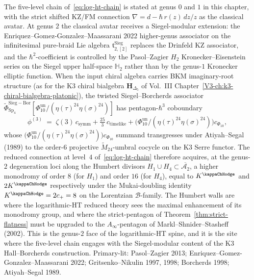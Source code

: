 \begin{remark}
\label{rem:genus2-siegel-borcherds-log-ht-extension}
The five-level chain of~\eqref{eq:log-ht-chain} is stated at genus $0$
and $1$ in this chapter, with the strict shifted KZ/FM connection
$\nabla = d - \hbar\,r(z)\,dz/z$ as the classical avatar. At genus $2$
the classical avatar receives a Siegel-modular extension: the
Enriquez--Gomez-Gonzalez--Maassarani 2022 higher-genus associator on
the infinitesimal pure-braid Lie algebra
$\mathfrak{t}^{\mathrm{Sieg}}_{2,[2]}$ replaces the Drinfeld KZ
associator, and the $\hbar^2$-coefficient is controlled by the
Pasol--Zagier $H_2$ Kronecker--Eisenstein series on the Siegel upper
half-space $\mathbb{H}_2$ rather than by the genus-$1$ Kronecker
elliptic function. When the input chiral algebra carries BKM
imaginary-root structure (as for the K3 chiral bialgebra
$\mathbf{H}_{\Delta_5}$ of Vol.~III
Chapter~\ref{V3-ch:k3-chiral-bialgebra-platonic}), the
twisted Siegel--Borcherds associator
\(\widetilde{\Phi}^{\mathrm{Sieg-Bor}}_{\mathrm{Sp}_4}
[\Phi_{10}^{\mathrm{un}}/(\eta(\tau)^{24}\eta(\sigma)^{24})]\)
has pentagon-$\hbar^3$ coboundary
\[
 \phi^{(3)}
 \;=\;
 \zeta(3)\,c_{\mathrm{symm}}
 + \tfrac{25}{3}\,c_{\mathrm{timelike}}
 + \bigl(\Phi_{10}^{\mathrm{un}}/(\eta(\tau)^{24}\eta(\sigma)^{24})\bigr)c_{\Phi_{10}},
\]
whose \(\bigl(\Phi_{10}^{\mathrm{un}}/(\eta(\tau)^{24}\eta(\sigma)^{24})\bigr)c_{\Phi_{10}}\) summand transgresses
under Atiyah--Segal (1989) to the order-$6$ projective
$\widetilde{M}_{24}$-umbral cocycle on the K3 Serre functor. The
reduced connection at level~$4$ of~\eqref{eq:log-ht-chain} therefore
acquires, at the genus-$2$ degeneration loci along the Humbert
divisors $H_1\cup H_4 \subset \overline{\mathcal{A}_2}$, a higher
monodromy of order $8$ (for $H_1$) and order $16$ (for $H_4$),
equal to $K^{\kappaChHodge}$ and $2K^{\kappaChHodge}$
respectively under the Mukai-doubling identity
$K^{\kappaChHodge} = 2c_+ = 8$ on the Lorentzian
$\mathcal{B}$-family. The Humbert walls are where the
logarithmic-HT reduced theory sees the maximal enhancement of its
monodromy group, and where the strict-pentagon of
Theorem~\ref{thm:strict-flatness} must be upgraded to the
$A_\infty$-pentagon of Markl--Shnider--Stasheff (2002). This is the
genus-$2$ face of the logarithmic-HT spine, and it is
the site where the five-level chain engages with the Siegel-modular
content of the K3 Hall--Borcherds construction. Primary-lit:
Pasol--Zagier 2013; Enriquez--Gomez-Gonzalez--Maassarani 2022;
Gritsenko--Nikulin 1997, 1998; Borcherds 1998; Atiyah--Segal 1989.
\end{remark}

